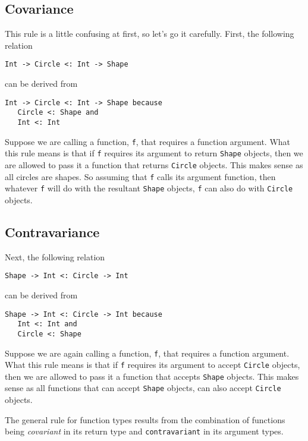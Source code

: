 \documentclass[10pt,oneside]{book}
\begin{document}
\subsection*{Covariance}
This rule is a little confusing at first, so let's go it carefully. First, the following relation
\begin{lstlisting}
Int -> Circle <: Int -> Shape
\end{lstlisting}
can be derived from
\begin{lstlisting}
Int -> Circle <: Int -> Shape because
   Circle <: Shape and
   Int <: Int
\end{lstlisting}
Suppose we are calling a function, \texttt{\frenchspacing f}, that requires a function argument. What this rule means is that if \texttt{\frenchspacing f} requires its argument to return \texttt{\frenchspacing Shape} objects, then we are allowed to pass it a function that returns \texttt{\frenchspacing Circle} objects. This makes sense as all circles are shapes. So assuming that \texttt{\frenchspacing f} calls its argument function, then whatever \texttt{\frenchspacing f} will do with the resultant \texttt{\frenchspacing Shape} objects, \texttt{\frenchspacing f} can also do with \texttt{\frenchspacing Circle} objects.

\subsection*{Contravariance}
Next, the following relation
\begin{lstlisting}
Shape -> Int <: Circle -> Int
\end{lstlisting}
can be derived from
\begin{lstlisting}
Shape -> Int <: Circle -> Int because
   Int <: Int and
   Circle <: Shape
\end{lstlisting}
Suppose we are again calling a function, \texttt{\frenchspacing f}, that requires a function argument. What this rule means is that if \texttt{\frenchspacing f} requires its argument to accept \texttt{\frenchspacing Circle} objects, then we are allowed to pass it a function that accepts \texttt{\frenchspacing Shape} objects. This makes sense as all functions that can accept \texttt{\frenchspacing Shape} objects, can also accept \texttt{\frenchspacing Circle} objects.

The general rule for function types results from the combination of functions being {\em covariant} in its return type and \texttt{\frenchspacing contravariant} in its argument types.
\end{document}
